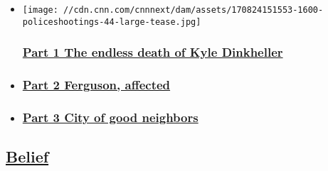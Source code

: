 \begin{itemize}
\item
  \href{http://www.cnn.com/interactive/2017/politics/state/kyle-dinkheller-police-video/}{}

  \texttt{[image: //cdn.cnn.com/cnnnext/dam/assets/170824151553-1600-policeshootings-44-large-tease.jpg]}

  \hypertarget{part-1-the-endless-death-of-kyle-dinkheller}{%
  \subsubsection{\texorpdfstring{\href{http://www.cnn.com/interactive/2017/politics/state/kyle-dinkheller-police-video/}{Part
  1 The endless death of Kyle
  Dinkheller}}{Part 1 The endless death of Kyle Dinkheller}}\label{part-1-the-endless-death-of-kyle-dinkheller}}
\item
  \hypertarget{part-2-ferguson-affected-}{%
  \subsubsection{\texorpdfstring{\href{http://www.cnn.com/interactive/2017/politics/state/ferguson-police-shooting/}{Part
  2 Ferguson, affected
  }}{Part 2 Ferguson, affected }}\label{part-2-ferguson-affected-}}
\item
  \hypertarget{part-3-city-of-good-neighbors-}{%
  \subsubsection{\texorpdfstring{\href{http://www.cnn.com/interactive/2017/politics/state/buffalo-police-shooting/}{Part
  3 City of good neighbors
  }}{Part 3 City of good neighbors }}\label{part-3-city-of-good-neighbors-}}
\end{itemize}

\hypertarget{belief-}{%
\subsection{\texorpdfstring{\href{/specials/belief}{Belief}~}{Belief~}}\label{belief-}}

